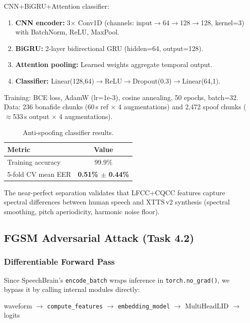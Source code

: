 \documentclass[11pt]{article}
\begin{document}
CNN+BiGRU+Attention classifier:
\begin{enumerate}
  \item \textbf{CNN encoder:} 3$\times$ Conv1D (channels: input$\to$64$\to$128$\to$128,
        kernel=3) with BatchNorm, ReLU, MaxPool.
  \item \textbf{BiGRU:} 2-layer bidirectional GRU (hidden=64, output=128).
  \item \textbf{Attention pooling:} Learned weights aggregate temporal output.
  \item \textbf{Classifier:} Linear(128,64)$\to$ReLU$\to$Dropout(0.3)$\to$Linear(64,1).
\end{enumerate}

Training: BCE loss, AdamW (lr=1e-3), cosine annealing, 50 epochs, batch=32.
Data: 236 bonafide chunks (60\,s ref $\times$ 4 augmentations) and 2,472
spoof chunks ($\approx$533\,s output $\times$ 4 augmentations).

\begin{table}[h]
\centering
\caption{Anti-spoofing classifier results.}
\label{tab:eer}
\small
\begin{tabular}{lc}
\toprule
\textbf{Metric} & \textbf{Value}\\
\midrule
Training accuracy & 99.9\%\\
5-fold CV mean EER & \textbf{0.51\% $\pm$ 0.44\%}\\
\bottomrule
\end{tabular}
\end{table}

The near-perfect separation validates that LFCC+CQCC features capture
spectral differences between human speech and XTTS\,v2 synthesis (spectral
smoothing, pitch aperiodicity, harmonic noise floor).

\subsection{FGSM Adversarial Attack (Task 4.2)}

\subsubsection{Differentiable Forward Pass}

Since SpeechBrain's \texttt{encode\_batch} wraps inference in
\texttt{torch.no\_grad()}, we bypass it by calling internal modules directly:

\begin{center}
\small
waveform $\!\to\!$ \texttt{compute\_features} $\!\to\!$ \texttt{embedding\_model}
$\!\to\!$ MultiHeadLID $\!\to\!$ logits
\end{center}
\end{document}
